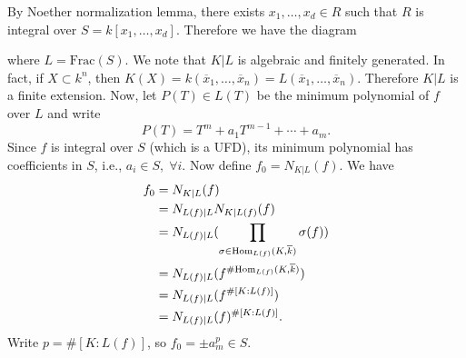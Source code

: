 By Noether normalization lemma, there exists $x_1,\dots, x_d\in R$ such that 
$R$ is integral over $S=k[x_1,\dots, x_d]$. Therefore we have the diagram 
\begin{center}
\end{center}
where $L=\text{Frac}(S)$. We note that $K|L$ is algebraic and finitely generated. In fact, if 
$X\subset k^n$, then  $K(X)=k(\overline{x}_1,\dots,\overline{x}_n)=L(\overline{x}_1,\dots,\overline{x}_n)$. 
Therefore $K|L$ is a finite extension. Now, let $P(T)\in L(T)$ be the minimum polynomial of $f$ over $L$ and write 
\begin{equation}
    P(T) = T^m + a_1T^{m-1}+\cdots+a_m.
\end{equation}
Since $f$ is integral over $S$ (which is a UFD), its minimum polynomial has coefficients in $S$, i.e., 
$a_i\in S,\;\forall i$. Now define $f_0 = N_{K|L}(f)$. We have 
\begin{equation}
    \begin{split}
        f_0 &= N_{K|L}(f)\\
        &=N_{L(f)|L}N_{K|L(f)}(f)\\
        &=N_{L(f)|L}(\prod_{\sigma\in\text{Hom}_{L(f)}(K,\overline{k})}\sigma(f))\\
        &=N_{L(f)|L}(f^{\#\text{Hom}_{L(f)}(K,\overline{k})})\\
        &=N_{L(f)|L}(f^{\#[K:L(f)]})\\
        &=N_{L(f)|L}(f)^{\#[K:L(f)]}.
    \end{split}
\end{equation}
Write $p=\#[K:L(f)]$, so $f_0=\pm a_m^p\in S$.\par 

